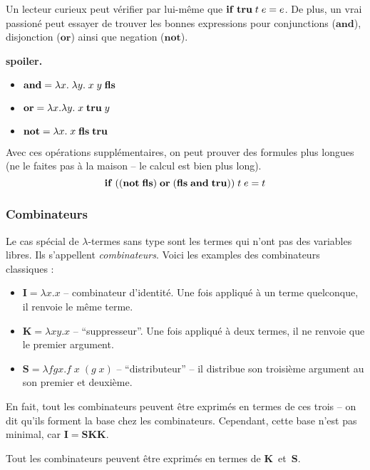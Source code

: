 Un lecteur curieux peut vérifier par lui-même que $\mathbf{if} \; \mathbf{tru} \; t \; e = e$.
De plus, un vrai passioné peut essayer de trouver les bonnes expressions pour conjunctions ($\mathbf{and}$), disjonction ($\mathbf{or}$) ainsi que negation ($\mathbf{not}$).

\textbf{spoiler.} 
\begin{itemize}
	\item $\mathbf{and} = \lambda x. \; \lambda y. \; x \; y \; \mathbf{fls}$
	\item $\mathbf{or} = \lambda x. \lambda y. \; x \; \mathbf{tru} \; y$
	\item $\mathbf{not} = \lambda x. \; x \; \mathbf{fls} \; \mathbf{tru}$
\end{itemize}

Avec ces opérations supplémentaires, on peut prouver des formules plus longues (ne le faites pas à la maison -- le calcul est bien plus long).
$$\mathbf{if} \; ((\mathbf{not} \; \mathbf{fls}) \; \mathbf{or} \; (\mathbf{fls} \; \mathbf{and} \; \mathbf{tru})) \; t \; e = t$$

\subsubsection*{Combinateurs}
Le cas spécial de $\lambda$-termes sans type sont les termes qui n'ont pas des variables libres. Ils s'appellent \emph{combinateurs}.
Voici les examples des combinateurs classiques :
\begin{itemize}
	\item $\mathbf{I} = \lambda x. x$ -- combinateur d'identité. Une fois appliqué à un terme quelconque, il renvoie le même terme.
	\item $\mathbf{K} = \lambda x y. x$ -- ``suppresseur''. Une fois appliqué à deux termes, il ne renvoie que le premier argument.
	\item $\mathbf{S} = \lambda fgx. f \; x \; (g \; x)$ -- ``distributeur'' -- il distribue son troisième argument au son premier et deuxième.
\end{itemize}
En fait, tout les combinateurs peuvent être exprimés en termes de ces trois -- on dit qu'ils forment la base chez les combinateurs.
Cependant, cette base n'est pas minimal, car $\mathbf{I} = \mathbf{SKK}$.

\begin{theorem}
Tout les combinateurs peuvent être exprimés en termes de $\mathbf{K}$~et~$\mathbf{S}$.
\end{theorem}

